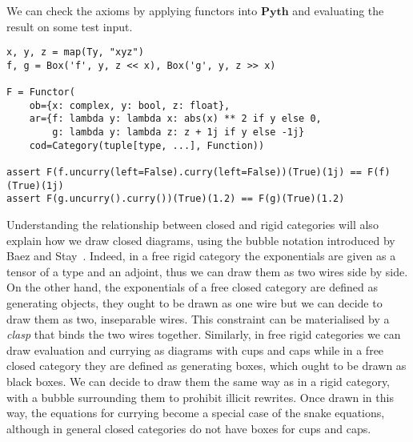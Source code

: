\begin{example}
We can check the axioms by applying functors into $\mathbf{Pyth}$ and evaluating the result on some test input.

\begin{verbatim}
x, y, z = map(Ty, "xyz")
f, g = Box('f', y, z << x), Box('g', y, z >> x)

F = Functor(
    ob={x: complex, y: bool, z: float},
    ar={f: lambda y: lambda x: abs(x) ** 2 if y else 0,
        g: lambda y: lambda z: z + 1j if y else -1j}
    cod=Category(tuple[type, ...], Function))

assert F(f.uncurry(left=False).curry(left=False))(True)(1j) == F(f)(True)(1j)
assert F(g.uncurry().curry())(True)(1.2) == F(g)(True)(1.2)
\end{verbatim}
\end{example}

Understanding the relationship between closed and rigid categories will also explain how we draw closed diagrams, using the bubble notation introduced by Baez and Stay~\cite[Section~2.6]{BaezStay09}.
Indeed, in a free rigid category the exponentials are given as a tensor of a type and an adjoint, thus we can draw them as two wires side by side.
On the other hand, the exponentials of a free closed category are defined as generating objects, they ought to be drawn as one wire but we can decide to draw them as two, inseparable wires.
This constraint can be materialised by a \emph{clasp} that binds the two wires together.
Similarly, in free rigid categories we can draw evaluation and currying as diagrams with cups and caps while in a free closed category they are defined as generating boxes, which ought to be drawn as black boxes.
We can decide to draw them the same way as in a rigid category, with a bubble surrounding them to prohibit illicit rewrites.
Once drawn in this way, the equations for currying become a special case of the snake equations, although in general closed categories do not have boxes for cups and caps.

